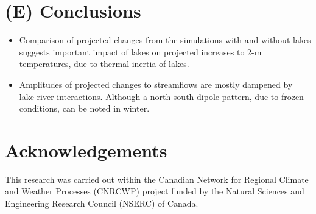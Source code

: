 \documentclass[a0,landscape]{a0poster}
\begin{document}
\begin{multicols}{3}
\section*{(E) Conclusions}

\begin{itemize}
\item Comparison of projected changes from the simulations with and without lakes suggests important impact of lakes on projected increases to 2-m temperatures, due to thermal inertia of lakes.
\item Amplitudes of projected changes to streamflows are mostly dampened by lake-river interactions. Although a north-south dipole pattern, due to frozen conditions, can be noted in winter.
\end{itemize}

\color{DarkSlateGray} %



\nocite{*} %
\small

\section*{Acknowledgements}
\small
This research was carried out within the Canadian Network for Regional Climate and Weather Processes (CNRCWP) project funded by the Natural Sciences and Engineering Research Council (NSERC) of Canada.

\end{multicols}
\end{document}
